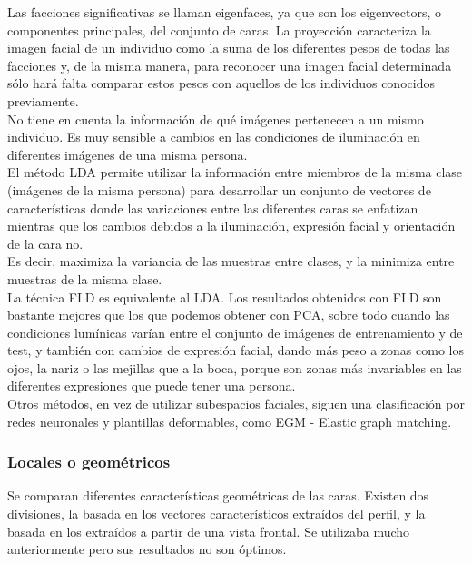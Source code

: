 \documentclass[a4paper,11pt]{article}
\begin{document}
	 Las facciones significativas se llaman eigenfaces, ya que son los eigenvectors, o componentes principales, del conjunto de caras. La proyección caracteriza la imagen facial de un individuo como la suma de los diferentes pesos de todas las facciones y, de la misma manera, para reconocer una imagen facial determinada sólo hará falta comparar estos pesos con aquellos de los individuos conocidos previamente. \\
	 
	 No tiene en cuenta la información de qué imágenes pertenecen a un mismo individuo. Es muy sensible a cambios en las condiciones de iluminación en diferentes imágenes de una misma persona.\\
	
	El método LDA permite utilizar la información entre miembros de la misma clase (imágenes de la misma persona) para desarrollar un conjunto de vectores de características donde las variaciones entre las diferentes caras se enfatizan mientras que los cambios debidos a la iluminación, expresión facial y orientación de la cara no.\\
	 Es decir, maximiza la variancia de las muestras entre clases, y la minimiza entre muestras de la misma clase.\\
	
	La técnica FLD es equivalente al LDA. Los resultados obtenidos con FLD son bastante mejores que los que podemos obtener con PCA, sobre todo cuando las condiciones lumínicas varían entre el conjunto de imágenes de entrenamiento y de test, y también con cambios de expresión facial, dando más peso a zonas como los ojos, la nariz o las mejillas que a la boca, porque son zonas más invariables en las diferentes expresiones que puede tener una persona.\\
	
	Otros métodos, en vez de utilizar subespacios faciales, siguen una clasificación por redes neuronales y plantillas deformables, como EGM - Elastic graph matching.\\
	\subsubsection{	Locales o geométricos}
 
	Se comparan diferentes características geométricas de las caras. Existen dos divisiones, la basada en los vectores característicos extraídos del perfil, y la basada en los extraídos a partir de una vista frontal. Se utilizaba mucho anteriormente pero sus resultados no son óptimos.
	
\end{document}
